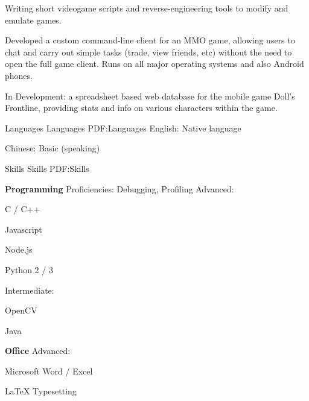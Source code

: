 \documentclass[letterpaper,MMMyyyy,nonstopmode]{style}
\begin{document}
\begin{Body}
Writing short videogame scripts and reverse-engineering tools to modify and emulate games.

Developed a custom command-line client for an MMO game, allowing users to chat and carry out simple tasks (trade, view friends, etc) without the need to open the full game client. Runs on all major operating systems and also Android phones.

In Development: a spreadsheet based web database for the mobile game Doll's Frontline, providing stats and info on various characters within the game.


\Section
{Languages}
{Languages}
{PDF:Languages}
English: Native language

Chinese: Basic (speaking)


\Section
{Skills}
{Skills}
{PDF:Skills}

\Entry
{\textbf{Programming}}
\Gap
Proficiencies: Debugging, Profiling
\Gap
Advanced:
\begin{enumerate*}[label=\SubBulletSymbol]
\item C / C++
\item Javascript
\item Node.js
\item Python 2 / 3
\end{enumerate*}
\Gap
Intermediate:
\begin{enumerate*}[label=\SubBulletSymbol]
\item OpenCV
\item Java
\end{enumerate*}
\Gap

\Entry
{\textbf{Office}}
\Gap
Advanced:
\begin{enumerate*}[label=\SubBulletSymbol]
\item Microsoft Word / Excel
\item LaTeX Typesetting
\end{enumerate*}

\end{Body}
\end{document}

